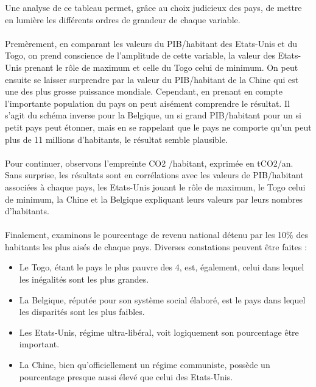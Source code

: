 \documentclass[a4paper, 11pt]{article}
\begin{document}
\begin{enumerate}[label=(\alph*)]
    Une analyse de ce tableau permet, grâce au choix judicieux des pays, de mettre en lumière les différents ordres de grandeur de chaque variable.
    \\
    \\
    Premèrement, en comparant les valeurs du PIB/habitant des Etats-Unis et du Togo, on prend conscience de l’amplitude de cette variable, la valeur des Etats-Unis prenant le rôle de maximum et celle du Togo celui de minimum. On peut ensuite se laisser surprendre par la valeur du PIB/habitant de la Chine qui est une des plus grosse puissance mondiale. Cependant, en prenant en compte l’importante population du pays on peut aisément comprendre le résultat. Il s'agit du schéma inverse pour la Belgique, un si grand PIB/habitant pour un si petit pays peut étonner, mais en se rappelant que le pays ne comporte qu’un peut plus de 11 millions d’habitants, le résultat semble plausible.
    \\
    \\
    Pour continuer, observons l’empreinte CO2 /habitant, exprimée en tCO2/an. Sans surprise, les résultats sont en corrélations avec les valeurs de PIB/habitant associées à chaque pays, les Etats-Unis jouant le rôle de maximum, le Togo celui de minimum, la Chine et la Belgique expliquant leurs valeurs par leurs nombres d’habitants.
    \\
    \\
    Finalement, examinons le pourcentage de revenu national détenu par les 10$\%$ des habitants les plus aisés de chaque pays. Diverses constations peuvent être faites :
    \begin{itemize}[leftmargin=2cm]
    \item Le Togo, étant le pays le plus pauvre des 4, est, également, celui dans lequel les inégalités sont les plus grandes. 
    \item La Belgique, réputée pour son système social élaboré, est le pays dans lequel les disparités sont les plus faibles.
    \item Les Etats-Unis, régime ultra-libéral, voit logiquement son pourcentage être important.
    \item La Chine, bien qu’officiellement un régime communiste, possède un pourcentage presque aussi élevé que celui des Etats-Unis.  
    \end{itemize}


\end{enumerate}
\end{document}

